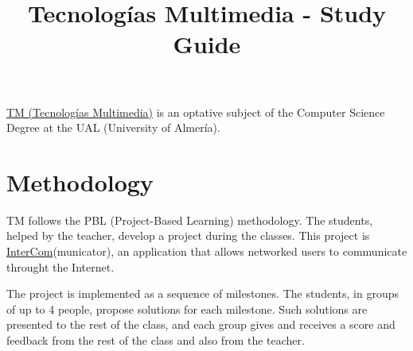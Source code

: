 \title{Tecnologías Multimedia - Study Guide}

\maketitle

\href{https://www.ual.es/estudios/grados/presentacion/plandeestudios/asignatura/4015/40154321}{TM
  (Tecnologías Multimedia)} is an optative subject of the Computer
Science Degree at the UAL (University of Almería).

\section{Methodology}
TM follows the PBL (Project-Based Learning) methodology. The students,
helped by the teacher, develop a project during the classes. This
project
is \href{https://github.com/Tecnologias-multimedia/intercom}{InterCom}(municator),
an application that allows networked users to communicate throught
the Internet.

The project is implemented as a sequence of milestones. The students,
in groups of up to 4 people, propose solutions for each
milestone. Such solutions are presented to the rest of the class, and
each group gives and receives a score and feedback from the rest of
the class and also from the teacher.

